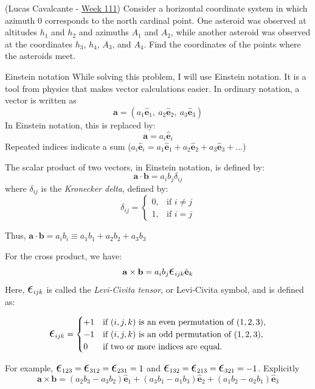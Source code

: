 \documentclass[11pt]{article}
\begin{document}
\begin{pproblem}(Lucas Cavalcante - \href{https://noic.com.br/olimpiadas/astronomia/problemas-da-semana/astronomia-semana-111/}{Week 111})
    Consider a horizontal coordinate system in which azimuth \(0\) corresponds to the north cardinal point. One asteroid was observed at altitudes \(h_1\) and \(h_2\) and azimuths \(A_1\) and \(A_2\), while another asteroid was observed at the coordinates \(h_3\), \(h_4\), \(A_3\), and \(A_4\). Find the coordinates of the points where the asteroids meet.
    
    \begin{psidea}{Einstein notation}{}
    While solving this problem, I will use Einstein notation. It is a tool from physics that makes vector calculations easier. In ordinary notation, a vector is written as
    \[\mathbf{a} = (a_1 \hat{\mathbf{e}}_1, \ a_2 \hat{\mathbf{e}}_2, \ a_3 \hat{\mathbf{e}}_3)\]
    In Einstein notation, this is replaced by:
    \[\mathbf{a} = a_i \hat{\mathbf{e}}_i\]
    Repeated indices indicate a sum (\(a_i \hat{\mathbf{e}}_i = a_1 \hat{\mathbf{e}}_1 + a_2 \hat{\mathbf{e}}_2 + a_3 \hat{\mathbf{e}}_3 + ...\))
    
    The scalar product of two vectors, in Einstein notation, is defined by:
    \[\mathbf{a}\cdot \mathbf{b} = a_i b_j \delta_{ij}\]
    where \(\delta_{ij}\) is the \textit{Kronecker delta}, defined by:
    \[\delta_{ij} = \left \{ \begin{matrix} 0, & \mbox{if } i \ne j \\ 
                                            1, & \mbox{if } i = j\end{matrix} \right.\]
    
    Thus, \(\mathbf{a}\cdot \mathbf{b} = a_i b_i \equiv a_1 b_1 + a_2 b_2 + a_3 b_3\)

    For the cross product, we have:
        \[
        \mathbf{a} \times \mathbf{b} = a_i b_j \Epsilon_{ijk} \hat{\mathbf{e}}_k
        \]
        Here, \(\Epsilon_{ijk}\) is called the \textit{Levi-Civita tensor}, or Levi-Civita symbol, and is defined as:
    
        \[
        \Epsilon_{ijk} = 
        \begin{cases} 
        +1 & \text{if } (i, j, k) \text{ is an even permutation of } (1, 2, 3), \\
        -1 & \text{if } (i, j, k) \text{ is an odd permutation of } (1, 2, 3), \\
        0 & \text{if two or more indices are equal}.
        \end{cases}
        \]

        For example, \(\Epsilon_{123} = \Epsilon_{312} = \Epsilon_{231} = 1\) and \(\Epsilon_{132} = \Epsilon_{213} = \Epsilon_{321} = -1\).
        Explicitly 
        \[\mathbf{a} \times \mathbf{b} = (a_2 b_3 - a_3 b_2) \hat{\mathbf{e}}_1 + (a_3 b_1 - a_1 b_3) \hat{\mathbf{e}}_2 + (a_1 b_2 - a_2 b_1) \hat{\mathbf{e}}_3\]
    \end{psidea}
\end{pproblem}
\end{document}
